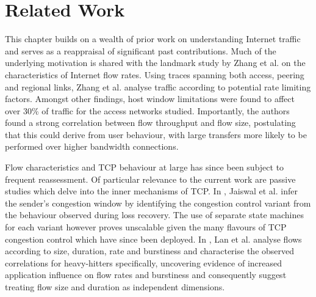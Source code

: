 \section{Related Work}
\label{section:malawi:related}

This chapter builds on a wealth of prior work on understanding Internet traffic and serves as a reappraisal of significant past contributions. 
Much of the underlying motivation is shared with the landmark study by Zhang et al. \cite{Zhang:2002p85} on the characteristics of Internet flow rates.
Using traces spanning both access, peering and regional links, Zhang et al. analyse traffic according to potential rate limiting factors.
Amongst other findings, host window limitations were found to affect over 30\% of traffic for the access networks studied.
Importantly, the authors found a strong correlation between flow throughput and flow size, postulating that this could derive from user behaviour, with large transfers more likely to be performed over higher bandwidth connections.

Flow characteristics and \ac{TCP} behaviour at large has since been subject to frequent reassessment.
Of particular relevance to the current work are passive studies which delve into the inner mechanisms of \ac{TCP}.
In \cite{Jaiswal:2004p242}, Jaiswal et al. infer the sender's congestion window by identifying the congestion control variant from the behaviour observed during loss recovery.
The use of separate state machines for each variant however proves unscalable given the many flavours of \ac{TCP} congestion control which have since been deployed.
In \cite{Lan:2006p566}, Lan et al. analyse flows according to size, duration, rate and burstiness and characterise the observed correlations for heavy-hitters specifically,
uncovering evidence of increased application influence on flow rates and burstiness and consequently suggest treating flow size and duration as independent dimensions.


